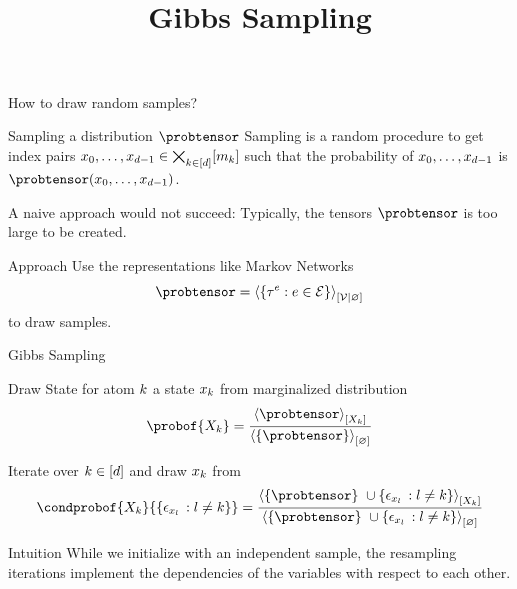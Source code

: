 \documentclass{beamer}
\title[Gibbs Sampling]{
	\coursechaptertwo \\
	{\huge Gibbs Sampling}
}
\begin{document}
{\frame[plain]{\titlepage}}



\begin{frame}{How to draw random samples?}

\begin{block}{Sampling a distribution $\probtensor$}
	Sampling is a random procedure to get index pairs $x_{0},\ldots,x_{d-1}\in\bigtimes_{k\in[d]}[m_{k}]$ such that the probability of $x_{0},\ldots,x_{d-1}$ is $\probtensor(\catindices)$.
\end{block}

{A naive approach would not succeed:} Typically, the tensors $\probtensor$ is too large to be created.

\medskip

\begin{block}{Approach}
	Use the representations like Markov Networks
		\[ \probtensor = \normalizationofwrt{\{\hypercoreof{\edge} : \edge \in \edges\}}{\nodes}{\varnothing}  \]
	to draw samples.
\end{block}

\end{frame}






\begin{frame}{Gibbs Sampling}


Draw State for atom $k$ a state $x_{k}$ from marginalized distribution 
	\[ \probof{\catvariableof{\atomenumerator}} = \frac{\contractionof{\probtensor}{\catvariableof{\atomenumerator}}
		}{
		\contractionof{\{\probtensor\}}{\varnothing}
		} \]

\medskip

Iterate over $k\in[d]$ and draw $x_{k}$ from 
		\[ \condprobof{\catvariableof{\atomenumerator}}{\{\onehotmapof{\atomlegindexof{\secatomenumerator}} \, : \secatomenumerator \neq \atomenumerator\}} = 
		\frac{
		\contractionof{\{\probtensor\} \cup \{\onehotmapof{\atomlegindexof{\secatomenumerator}} \, : \secatomenumerator \neq \atomenumerator \}}{\catvariableof{\atomenumerator}}
		}{
		\contractionof{\{\probtensor\} \cup \{\onehotmapof{\atomlegindexof{\secatomenumerator}} \, : \secatomenumerator \neq \atomenumerator \}}{\varnothing}
		} \]

\begin{block}{Intuition}
	While we initialize with an independent sample, the resampling iterations implement the dependencies of the variables with respect to each other.
\end{block}

\end{frame}
\end{document}
